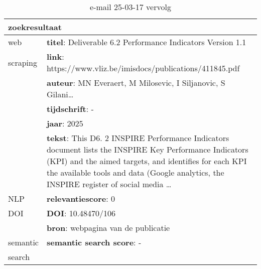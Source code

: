 \begin{table}[h!]
    \caption{e-mail 25-03-17 vervolg}
    \centering
    \begin{tabularx}{\textwidth}{|p{4cm}|X|} 
        \hline
        \multicolumn{2}{|X|}{\textbf{zoekresultaat}} \\
        \hline
        web &\textbf{titel}: Deliverable 6.2 Performance Indicators Version 1.1\\
        scraping&\textbf{link}: https://www.vliz.be/imisdocs/publications/411845.pdf\\
        &\textbf{auteur}: MN Everaert, M Milosevic, I Siljanovic, S Gilani…\\
        &\textbf{tijdschrift}: -\\
        &\textbf{jaar}: 2025\\
        &\textbf{tekst}: This D6. 2 INSPIRE Performance Indicators document lists the INSPIRE Key Performance Indicators (KPI) and the aimed targets, and identifies for each KPI the available tools and data (Google analytics, the INSPIRE register of social media …\\
        \hline
        NLP&\textbf{relevantiescore}: 0\\
        \hline
        DOI&\textbf{DOI}: 10.48470/106\\
        &\textbf{bron}: webpagina van de publicatie\\
        \hline
        semantic&\textbf{semantic search score}: -\\
        search&\\
        \hline
    \end{tabularx}
    \label{table:email20250317vervolg}
\end{table}
